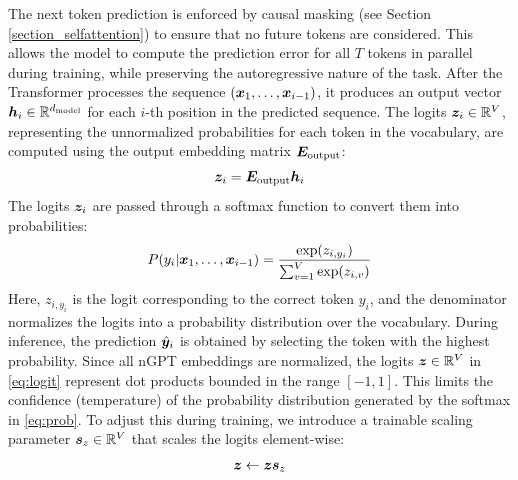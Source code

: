 \documentclass{article} %
\begin{document}
The next token prediction  
is enforced by causal masking (see Section \ref{section_selfattention}) to ensure that  no future tokens are considered. This allows the model to compute the prediction error for all $T$ tokens in parallel during training, while preserving the autoregressive nature of the task. 
After the Transformer processes the sequence $({\bm{x}}_1, \dots, {\bm{x}}_{i-1})$, it produces an output vector ${\bm{h}}_i \in \mathbb{R}^{d_{\text{model}}}$ for each $i$-th position in the predicted sequence. The logits ${\bm{z}}_i \in \mathbb{R}^V$, representing the unnormalized probabilities for each token in the vocabulary, are computed using the output embedding matrix ${\bm{E}}_{\text{output}}$:
   \begin{equation}
    {\bm{z}}_i = {\bm{E}}_{\text{output}} {\bm{h}}_i 
    \label{eq:logit}
    \end{equation}
The logits ${\bm{z}}_i$ are passed through a softmax function to convert them into probabilities:
\begin{equation}
P(y_i | {\bm{x}}_1, \dots, {\bm{x}}_{i-1}) = \frac{\exp(z_{i,y_i})}{\sum_{v=1}^{V} \exp(z_{i,v})}
\label{eq:prob}
\end{equation}
Here, $z_{i,y_i}$ is the logit corresponding to the correct token $y_i$, and the denominator normalizes the logits into a probability distribution over the  vocabulary. During inference, the prediction $\hat{{\bm{y}}}_i$ is obtained by selecting the token with the highest probability.
Since all nGPT embeddings are normalized, the logits ${\bm{z}} \in \mathbb{R}^V$ in \eqref{eq:logit} represent dot products bounded in the range $[-1,1]$. This limits the confidence (temperature) of the probability distribution generated by the softmax in \eqref{eq:prob}. 
To adjust this during training, we introduce a trainable scaling parameter ${\bm{s}}_{z}\in \mathbb{R}^V$ that scales the logits element-wise:
\begin{align}
    {\bm{z}} \leftarrow {\bm{z}} {\bm{s}}_{z}\label{eq:sscalingnew}
\end{align}
\end{document}
